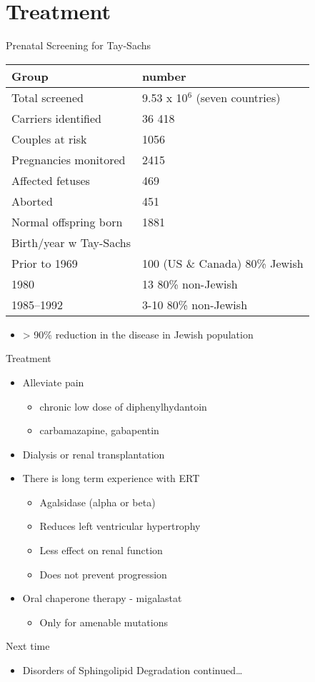 \documentclass[presentation, smaller]{beamer}
\begin{document}
\section{Treatment}
\label{sec:orgheadline22}
\begin{frame}[label={sec:orgheadline19}]{Prenatal Screening for Tay-Sachs}
\begin{center}
\begin{tabular}{ll}
Group & number\\
\hline
Total screened & 9.53 x 10\(^{\text{6}}\) (seven countries)\\
Carriers identified & 36 418\\
Couples at risk & 1056\\
Pregnancies monitored & 2415 \footnotemark[2]{}\\
Affected fetuses & 469\\
Aborted & 451\\
Normal offspring born & 1881\\
Birth/year w Tay-Sachs & \\
Prior to 1969 & 100 (US \& Canada) 80\% Jewish\\
1980 & 13 80\% non-Jewish\\
1985–1992 & 3-10 80\% non-Jewish\\
\end{tabular}
\end{center}

\begin{itemize}
\item > 90\% reduction in the disease in Jewish population
\end{itemize}
\end{frame}
\begin{frame}[label={sec:orgheadline20}]{Treatment}
\begin{itemize}
\item Alleviate pain
\begin{itemize}
\item chronic low dose of diphenylhydantoin
\item carbamazapine, gabapentin
\end{itemize}
\item Dialysis or renal transplantation
\item There is long term experience with ERT
\begin{itemize}
\item Agalsidase (alpha or beta)
\item Reduces left ventricular hypertrophy
\item Less effect on renal function
\item Does not prevent progression
\end{itemize}
\item Oral chaperone therapy - migalastat
\begin{itemize}
\item Only for amenable mutations
\end{itemize}
\end{itemize}
\end{frame}

\begin{frame}[label={sec:orgheadline21}]{Next time}
\begin{itemize}
\item Disorders of Sphingolipid Degradation continued\ldots{}
\end{itemize}
\end{frame}
\end{document}
